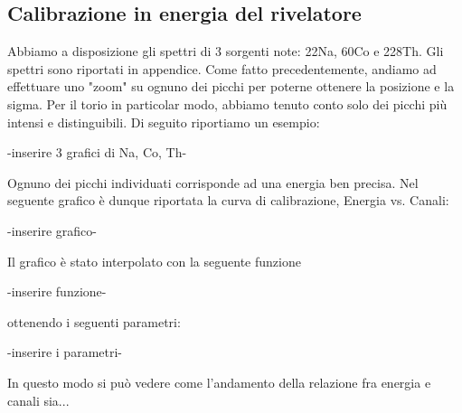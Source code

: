 \documentclass[a4paper,10pt]{article}
\begin{document}
\subsection{Calibrazione in energia del rivelatore}
Abbiamo a disposizione gli spettri di 3 sorgenti note: 22Na, 60Co e 228Th. Gli spettri sono riportati in appendice. Come fatto precedentemente, andiamo ad effettuare uno "zoom" su ognuno dei picchi per poterne ottenere la posizione e la sigma. Per il torio in particolar modo, abbiamo tenuto conto solo dei picchi più intensi e distinguibili. Di seguito riportiamo un esempio:

-inserire 3 grafici di Na, Co, Th-

Ognuno dei picchi individuati corrisponde ad una energia ben precisa. Nel seguente grafico è dunque riportata la curva di calibrazione, Energia vs. Canali:

-inserire grafico-

Il grafico è stato interpolato con la seguente funzione 

-inserire funzione-

ottenendo i seguenti parametri:

-inserire i parametri-

In questo modo si può vedere come l'andamento della relazione fra energia e canali sia...
\end{document}
